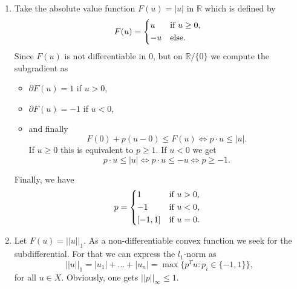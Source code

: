     \begin{example}
    \label{ex:subgradient_subdifferential}

        \begin{enumerate}
            \item Take the absolute value function $F(u) = |u|$ in $\mathbb{R}$ which is defined by
                $$
                    F(u) =
                        \begin{dcases*}
                            u & \textnormal{if $u \ge 0$,} \\
                            -u & \textnormal{else}.
                        \end{dcases*}
                $$
            Since $F(u)$ is not differentiable in $0$, but on $\mathbb{R} / \{0\}$ we compute the subgradient as
                \begin{itemize}
                    \item $\partial F(u) = 1$ if $u > 0$,
                    \item $\partial F(u) = -1$ if $u < 0$,
                    \item and finally
                        $$
                            F(0) + p(u - 0) \le F(u) \Longleftrightarrow p \cdot u \le |u|.
                        $$
                    If $u \ge 0$ this is equivalent to $p \ge 1$. If $u < 0$ we get
                        $$
                            p \cdot u \le |u| \Longleftrightarrow p \cdot u \le -u \Longleftrightarrow p \ge -1.
                        $$
                \end{itemize}
            Finally, we have
                $$
                    p =
                        \begin{dcases*}
                            1 & \textnormal{if $u > 0$,} \\
                            -1 & \textnormal{if $u < 0$,} \\
                            [-1, 1] & \textnormal{if $u = 0$.}
                        \end{dcases*}
                $$
            \item Let $F(u) = ||u||_{1}$. As a non-differentiable convex function we seek for the subdifferential. For that we can express the $l_{1}$-norm as 
                $$
                    ||u||_{1} = |u_{1}| + ... + |u_{n}| = \max \big\{ p^{T}u : p_{i} \in \{-1, 1\} \big\},
                $$
             for all $u \in X$. Obviously, one gets $||p||_{\infty} \le 1$. %

\end{enumerate}
\end{example}
